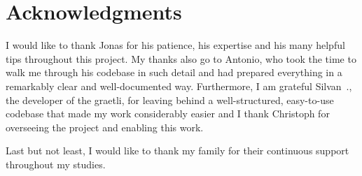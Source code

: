 \chapter*{Acknowledgments}

I would like to thank Jonas for his patience, his expertise and his many helpful tips throughout this project. My thanks also go to Antonio, who took the time to walk me through his codebase in such detail and had prepared everything in a remarkably clear and well-documented way. Furthermore, I am grateful Silvan~., the developer of the graetli, for leaving behind a well-structured, easy-to-use codebase that made my work considerably easier and I thank Christoph for overseeing the project and enabling this work.

Last but not least, I would like to thank my family for their continuous support throughout my studies.
